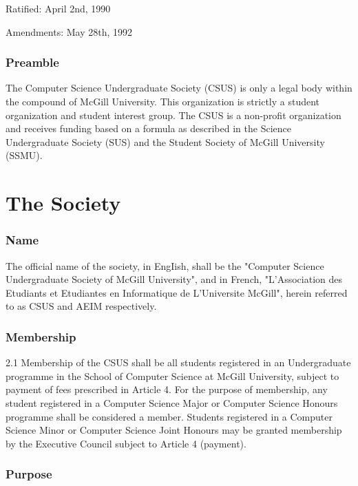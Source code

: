 Ratified: April 2nd, 1990

Amendments: May 28th, 1992

\section*{Preamble}\label{preamble}

The Computer Science Undergraduate Society (CSUS) is only a legal body
within the compound of McGill University. This organization is strictly
a student organization and student interest group. The CSUS is a
non-profit organization and receives funding based on a formula as
described in the Science Undergraduate Society (SUS) and the Student
Society of McGill University (SSMU).

\part{The Society}\label{the-society}

\section{Name}\label{name}

The official name of the society, in EngIish, shall be the "Computer
Science Undergraduate Society of McGill University", and in French,
"L'Association des Etudiants et Etudiantes en Informatique de
L'Universite McGill", herein referred to as CSUS and AEIM respectively.

\section{Membership}\label{membership}

2.1 Membership of the CSUS shall be all students registered in an
Undergraduate programme in the School of Computer Science at McGill
University, subject to payment of fees prescribed in Article 4. For the
purpose of membership, any student registered in a Computer Science
Major or Computer Science Honours programme shall be considered a
member. Students registered in a Computer Science Minor or Computer
Science Joint Honours may be granted membership by the Executive Council
subject to Article 4 (payment).

\section{Purpose}\label{purpose}

